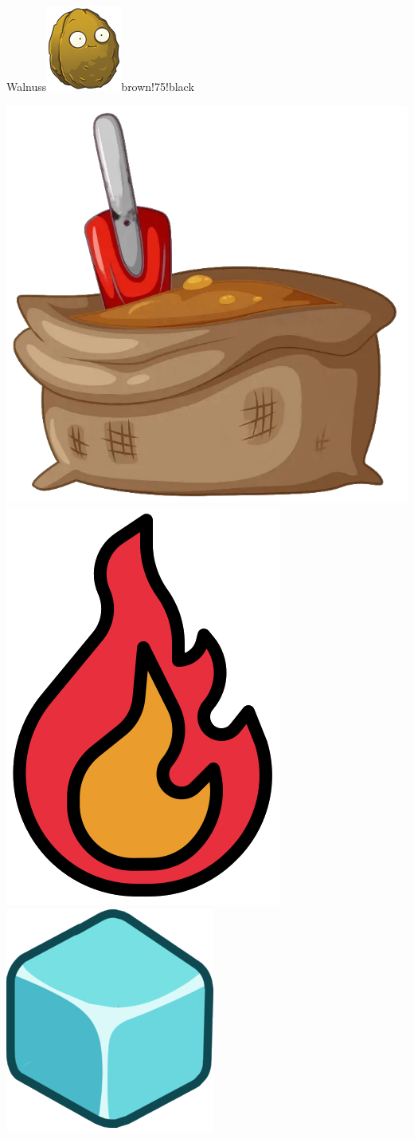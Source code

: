 \documentclass[11pt, a5paper]{article}
\def\now{\hspace{0.2cm}}
\begin{document}
\begin{mybox}{Walnuss}{\includegraphics[scale=0.25]{walnut}}{brown!75!black}
\begin{minipage}[t]{\textwidth}
			\now\includegraphics[scale=0.04]{dirt} 
			\now\includegraphics[scale=0.075]{firef} 
			\now\includegraphics[scale=0.3]{icei} 

\end{minipage}
\end{mybox}
\end{document}
